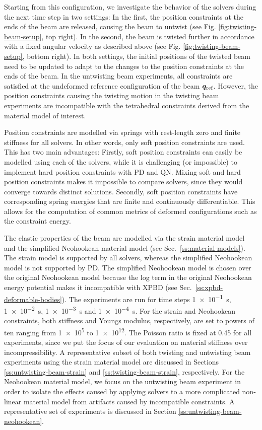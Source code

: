 Starting from this configuration, we investigate the behavior of the 
solvers during the next time step in two settings: In the first, the position constraints at the ends of the beam are released, causing the 
beam to untwist (see Fig. \ref{fig:twisting-beam-setup}, top right). In the second, the beam is twisted further in accordance with a fixed angular
velocity as described above (see Fig. \ref{fig:twisting-beam-setup}, bottom right). In both settings, the initial positions of the twisted beam 
need to be updated to adapt to the changes to the position constraints at the ends of the beam. In the untwisting beam experiments, all constraints are satisfied at the 
undeformed reference configuration of the beam $\bm{q}_\text{ref}$. However, the position constraints causing the twisting motion in the twisting beam experiments are 
incompatible with the tetrahedral constraints derived from the material model of interest. 

Position constraints are modelled via springs with rest-length zero and finite stiffness for all solvers. In other words, only soft position constraints 
are used. This has two main advantages: Firstly, soft position constraints can easily be modelled using each of the solvers, while it is challenging (or impossible) to 
implement hard position constraints with PD and QN. Mixing soft and hard position constraints makes it impossible to compare solvers,
since they would converge towards distinct solutions. Secondly, soft position constraints have corresponding spring energies that are 
finite and continuously differentiable. This allows for the computation of common metrics of deformed configurations such as the constraint 
energy. 

The elastic properties of the beam are modelled via the strain material model and the simplified Neohookean 
material model (see Sec.\ \ref{ss:material-models}). The strain model is supported by all solvers, whereas the simplified Neohookean model is 
not supported by PD. The simplified Neohookean model is chosen over the original Neohookean model because the log term in the original 
Neohookean energy potential makes it incompatible with XPBD (see Sec.\ \ref{ss:xpbd-deformable-bodies}). The experiments are run for time steps 
\SI{1e-1}{\second}, \SI{1e-2}{\second}, \SI{1e-3}{\second} and \SI{1e-4}{\second}. For the strain and Neohookean constraints, both 
stiffness and Youngs modulus, respectively, are set to powers of ten ranging from \num{1e5} to \num{1e12}. The Poisson ratio is fixed 
at 0.45 for all experiments, since we put the focus of our evaluation on material stiffness over incompressibility. A representative subset of both twisting and untwisting 
beam experiments using the strain material model are discussed in Sections \ref{ss:untwisting-beam-strain} and \ref{ss:twisting-beam-strain}, respectively. For the 
Neohookean material model, we focus on the untwisting beam experiment in order to isolate the effects caused by applying solvers to a more complicated non-linear material 
model from artifacts caused by incompatible constraints. A representative set of experiments is discussed in Section \ref{ss:untwisting-beam-neohookean}.

